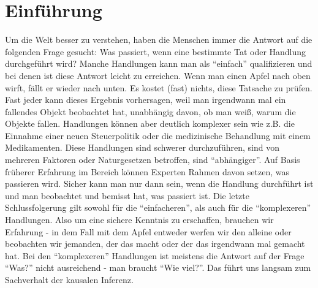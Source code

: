 \documentclass[12pt,a4paper,twoside]{scrartcl}
\numberwithin{equation}{section}
\begin{document}
\renewcommand\sectionmark[1]{\markboth{\thesection\quad\MakeUppercase{#1}}{\thesection\quad\MakeUppercase{#1}}}
\renewcommand\subsectionmark[1]{\markright{\thesubsection\quad\MakeUppercase{#1}}}

\tableofcontents
\clearpage

\pagestyle{normal}

\section{Einführung}\label{sec:einführung}
Um die Welt besser zu verstehen, haben die Menschen immer die Antwort auf die folgenden Frage gesucht: Was passiert, wenn eine bestimmte Tat oder Handlung durchgeführt wird? Manche Handlungen kann man als \enquote{einfach} qualifizieren und bei denen ist diese Antwort leicht zu erreichen. Wenn man einen Apfel nach oben wirft, fällt er wieder nach unten. Es kostet (fast) nichts, diese Tatsache zu prüfen. Fast jeder kann dieses Ergebnis vorhersagen, weil man irgendwann mal ein fallendes Objekt beobachtet hat, unabhängig davon, ob man weiß, warum die Objekte fallen. Handlungen können aber deutlich komplexer sein wie z.B. die Einnahme einer neuen Steuerpolitik oder die medizinische Behandlung mit einem Medikamenten. Diese Handlungen sind schwerer durchzuführen, sind von mehreren Faktoren oder Naturgesetzen betroffen, sind \enquote{abhängiger}. Auf Basis früherer Erfahrung im Bereich können Experten Rahmen davon setzen, was passieren wird. Sicher kann man nur dann sein, wenn die Handlung durchführt ist und man beobachtet und bemisst hat, was passiert ist. Die letzte Schlussfolgerung gilt sowohl für die \enquote{einfacheren}, als auch für die \enquote{komplexeren} Handlungen. Also um eine sichere Kenntnis zu erschaffen, brauchen wir Erfahrung - in dem Fall mit dem Apfel entweder werfen wir den alleine oder beobachten wir jemanden, der das macht oder der das irgendwann mal gemacht hat. Bei den \enquote{komplexeren} Handlungen ist meistens die Antwort auf der Frage \enquote{Was?}  nicht ausreichend - man braucht \enquote{Wie viel?}. Das führt uns langsam zum Sachverhalt der kausalen Inferenz.      
\end{document}
